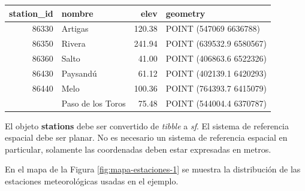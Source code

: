 \documentclass[
  12pt]{article}
\begin{document}
\begin{table}[H]
\centering
\begin{tabular}{rlrl}
\toprule
station\_id & nombre & elev & geometry\\
\midrule
86330 & Artigas & 120.38 & POINT (547069 6636788)\\
86350 & Rivera & 241.94 & POINT (639532.9 6580567)\\
86360 & Salto & 41.00 & POINT (406863.6 6522326)\\
86430 & Paysandú & 61.12 & POINT (402139.1 6420293)\\
86440 & Melo & 100.36 & POINT (764393.7 6415079)\\
\addlinespace
86460 & Paso de los Toros & 75.48 & POINT (544004.4 6370787)\\
\bottomrule
\end{tabular}
\end{table}

El objeto \textbf{stations} debe ser convertido de \emph{tibble} a \emph{sf}. El sistema de referencia espacial debe ser planar. No es necesario un sistema de referencia espacial en particular, solamente las coordenadas deben estar expresadas en metros.

En el mapa de la Figura \ref{fig:mapa-estaciones-1} se muestra la distribución de las estaciones meteorológicas usadas en el ejemplo.
\end{document}
